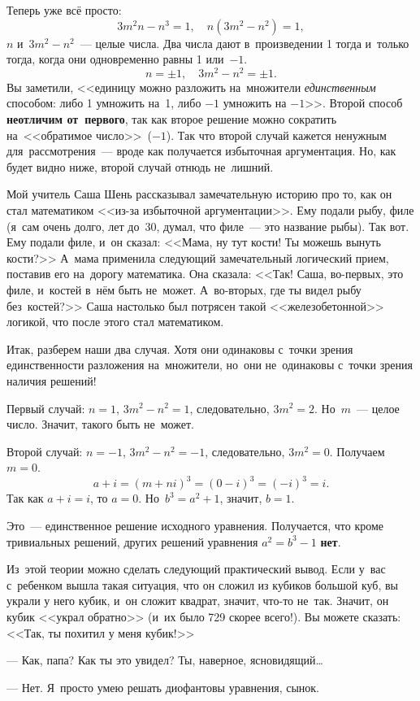 Теперь уже всё просто:
$$
3m^{2}n-n^{3}=1,\quad
n(3m^{2}-n^{2})=1,
$$
$n$ и~$3m^{2}-n^{2}$~--- целые числа. Два числа дают в~произведении 1 тогда и~только тогда, когда
они одновременно равны 1 или~$-1$.
$$
n=\pm1,\quad
3m^{2}-n^{2}=\pm1.
$$
Вы заметили, <<единицу можно разложить на~множители \textit{единственным} способом: либо 1 умножить на~1,
либо $-1$ умножить на $-1$>>. Второй способ \textbf{неотличим от~первого}, так как второе решение можно сократить
на~<<обратимое число>>~($-1$). Так что второй случай кажется ненужным для~рассмотрения~--- вроде как
получается избыточная аргументация. Но, как будет видно ниже, второй случай отнюдь не~лишний.

Мой учитель Саша Шень рассказывал замечательную историю про то, как он стал математиком <<из-за избыточной
аргументации>>.
 Ему подали рыбу, филе (я~сам очень долго, лет до~30, думал, что филе~--- это название
рыбы). Так вот. Ему подали филе, и~он сказал: <<Мама, ну тут кости! Ты можешь вынуть кости?>>
А~мама применила следующий замечательный логический прием, поставив его на~дорогу математика. Она
сказала: <<Так! Саша, во-первых, это филе, и~костей в~нём быть не~может. А~во-вторых, где ты видел
рыбу без~костей?>> Саша настолько был потрясен такой <<железобетонной>> логикой, что после этого стал
математиком.

Итак, разберем наши два случая. Хотя они одинаковы с~точки зрения единственности разложения
на~множители, но~они не~одинаковы с~точки зрения наличия решений!

Первый случай: $n=1$, $3m^{2}-n^{2}=1$, следовательно, $3m^{2}=2$. Но~$m$~--- целое число. Значит, такого быть не~может.

Второй случай: $n=-1$, $3m^{2}-n^{2} =-1$, следовательно, $3m^{2}=0$. Получаем $m=0$.
$$
a+i=(m+ni)^{3} =(0-i)^{3}=(-i)^{3}=i.
$$
Так как $a+i = i$, то $a=0$. Но~$b^{3} =a^{2}+1$, значит, $b=1$.

Это~--- единственное решение исходного уравнения. Получается, что кроме тривиальных решений, других
решений уравнения $a^{2}=b^{3}-1$ \textbf{нет}.

Из~этой теории можно сделать следующий практический вывод. Если у~вас с~ребенком вышла такая
ситуация, что он сложил из кубиков большой куб, вы украли у него кубик, и~он сложит квадрат, значит, что-то
не~так. Значит, он кубик <<украл обратно>> (и~их было 729 скорее всего!). Вы можете сказать: <<Так, ты похитил у меня кубик!>>

--- Как, папа? Как ты это увидел? Ты, наверное, ясновидящий\ldots

--- Нет. Я~просто умею решать диофантовы уравнения, сынок.
